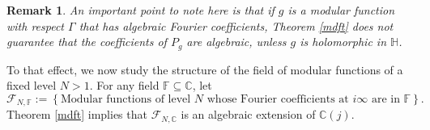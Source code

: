 \documentclass[11pt, reqno]{amsart}
\newtheorem*{remark*}{Remark}
\begin{document}
\begin{remark*}
An important point to note here is that if $g$ is a modular function with respect $\Gamma$ that has algebraic Fourier coefficients, Theorem \ref{mdft} does not guarantee that the coefficients of $P_g$ are algebraic, unless $g$ is holomorphic in $\mathbb{H}$. 
\end{remark*}


To that effect, we now study the structure of the field of modular functions of a fixed level $N>1$. For any field $\mathbb{F} \subseteq \mathbb{C}$, let
\begin{equation*}
    \mathcal{F}_{N, \mathbb{F}} := \left\{ \text{Modular functions of level $N$ whose Fourier coefficients at $i \infty$ are in $\mathbb{F}$} \right\}.
\end{equation*}
Theorem \ref{mdft} implies that $\mathcal{F}_{N,\mathbb{C}}$ is an algebraic extension of $\mathbb{C}(j)$. 
\end{document}
